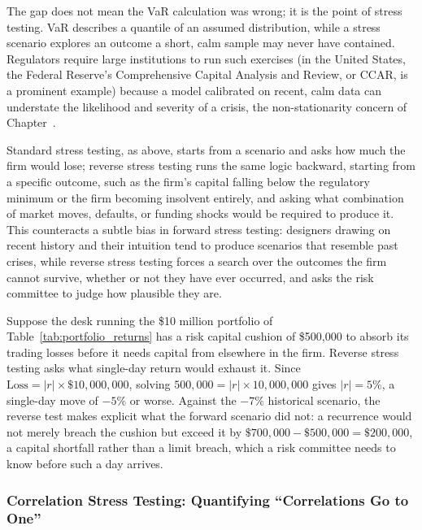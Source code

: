 \documentclass[../ai_in_finance]{subfiles}
\begin{document}
The gap does not mean the VaR calculation was wrong; it is the point of stress testing. VaR describes a quantile of an assumed distribution, while a stress scenario explores an outcome a short, calm sample may never have contained.
Regulators require large institutions to run such exercises (in the United States, the Federal Reserve's Comprehensive Capital Analysis and Review, or CCAR, is a prominent example) because a model calibrated on recent, calm data can understate the likelihood and severity of a crisis, the non-stationarity concern of Chapter~.

Standard stress testing, as above, starts from a scenario and asks how much the firm would lose; reverse stress testing runs the same logic backward, starting from a specific outcome, such as the firm's capital falling below the regulatory minimum or the firm becoming insolvent entirely, and asking what combination of market moves, defaults, or funding shocks would be required to produce it.
This counteracts a subtle bias in forward stress testing: designers drawing on recent history and their intuition tend to produce scenarios that resemble past crises, while reverse stress testing forces a search over the outcomes the firm cannot survive, whether or not they have ever occurred, and asks the risk committee to judge how plausible they are.

Suppose the desk running the \$10 million portfolio of Table~\ref{tab:portfolio_returns} has a risk capital cushion of \$500,000 to absorb its trading losses before it needs capital from elsewhere in the firm. Reverse stress testing asks what single-day return would exhaust it. Since $\text{Loss} = |r| \times \$10{,}000{,}000$, solving $500{,}000 = |r| \times 10{,}000{,}000$ gives $|r| = 5\%$, a single-day move of $-5\%$ or worse.
Against the $-7\%$ historical scenario, the reverse test makes explicit what the forward scenario did not: a recurrence would not merely breach the cushion but exceed it by $\$700{,}000 - \$500{,}000 = \$200{,}000$, a capital shortfall rather than a limit breach, which a risk committee needs to know before such a day arrives.

\subsubsection*{Correlation Stress Testing: Quantifying ``Correlations Go to One''}
\end{document}
